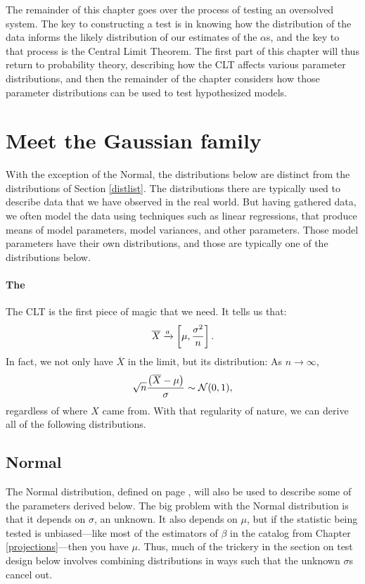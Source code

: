 The remainder of this chapter goes over the process of testing 
an oversolved system. The key to constructing a test is in knowing 
how the distribution of the data informs the likely distribution of
our estimates of the $\alpha$s, and the key to that process is the
Central Limit Theorem. The first part of this chapter will thus return
to probability theory, describing how the CLT affects various parameter
distributions, and then the remainder of the chapter considers how 
those parameter distributions can be used to test hypothesized models.

\section{Meet the Gaussian family} \label{dist2}
With the exception of the Normal, the distributions below are distinct
from the distributions of Section \ref{distlist}. The distributions
there
are typically used to describe data that we have observed in the real
world. But having gathered data, we often model the data using techniques
such as linear regressions, that produce means of model parameters,
model variances, and other parameters. Those model parameters have their
own distributions, and those are typically one of the distributions below.


\paragraph{The } The CLT is the first piece of magic
that we need. It tells us that:
$$\overline X \xrightarrow{a} \left[\mu,{\sigma^2\over n}\right].$$
In fact, we not only have $\overline X$ in the limit, but its distribution:
As $n\to \infty$, $$\sqrt{n} \frac{\left(\overline X - \mu\right)}{\sigma} \sim {\cal N}(0,1),$$ 
regardless of where $X$ came from. With that regularity of nature,
we can derive all of the following distributions.  \label{CLT}

\subsection{Normal} 

The Normal distribution, defined on page \pageref{normal},
will also be used to describe some of the parameters derived below.
The big problem with the Normal distribution is that it depends on $\sigma$, an
unknown. It also depends on $\mu$, but if the statistic
being tested is unbiased---like most of the estimators of $\beta$ in the
catalog from Chapter \ref{projections}---then you have $\mu$. Thus, much of the trickery in the
section on test design below involves combining distributions in ways
such that the unknown $\sigma$s cancel out.

